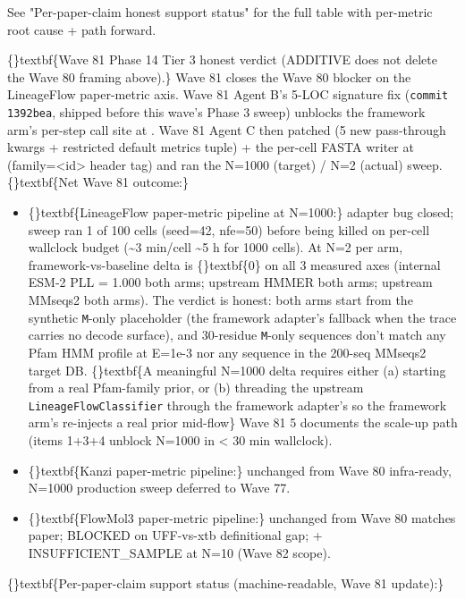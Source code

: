 \documentclass{article}
\begin{document}
See  "Per-paper-claim honest support status" for the full table with per-metric root cause + path forward.

\{\}textbf\{Wave 81 Phase 14 Tier 3 honest verdict (ADDITIVE  does not delete the Wave 80 framing above).\} Wave 81 closes the Wave 80  blocker on the LineageFlow paper-metric axis. Wave 81 Agent B's 5-LOC  signature fix (\texttt{commit 1392bea}, shipped before this wave's Phase 3 sweep) unblocks the framework arm's per-step  call site at . Wave 81 Agent C then patched  (5 new pass-through kwargs + restricted default metrics tuple) + the per-cell FASTA writer at  (family=<id> header tag) and ran the N=1000 (target) / N=2 (actual) sweep. \{\}textbf\{Net Wave 81 outcome:\}

\begin{itemize}
\item \{\}textbf\{LineageFlow paper-metric pipeline at N=1000:\} adapter bug closed; sweep ran 1 of 100 cells (seed=42, nfe=50) before being killed on per-cell wallclock budget (\textasciitilde{}3 min/cell  \textasciitilde{}5 h for 1000 cells). At N=2 per arm, framework-vs-baseline delta is \{\}textbf\{0\} on all 3 measured axes (internal ESM-2 PLL = 1.000 both arms; upstream HMMER  both arms; upstream MMseqs2  both arms). The  verdict is honest: both arms start from the synthetic \texttt{M}-only placeholder (the framework adapter's  fallback when the trace carries no decode surface), and 30-residue \texttt{M}-only sequences don't match any Pfam HMM profile at E=1e-3 nor any sequence in the 200-seq MMseqs2 target DB. \{\}textbf\{A meaningful N=1000 delta requires either (a) starting from a real Pfam-family prior, or (b) threading the upstream \texttt{LineageFlowClassifier} through the framework adapter's  so the framework arm's  re-injects a real prior mid-flow\}  Wave 81 5 documents the scale-up path (items 1+3+4 unblock N=1000 in < 30 min wallclock).
\item \{\}textbf\{Kanzi paper-metric pipeline:\} unchanged from Wave 80  infra-ready, N=1000 production sweep deferred to Wave 77.
\item \{\}textbf\{FlowMol3 paper-metric pipeline:\} unchanged from Wave 80   matches paper;  BLOCKED on UFF-vs-xtb definitional gap;  +  INSUFFICIENT\_SAMPLE at N=10 (Wave 82 scope).
\end{itemize}
\{\}textbf\{Per-paper-claim support status (machine-readable, Wave 81 update):\}
\end{document}
